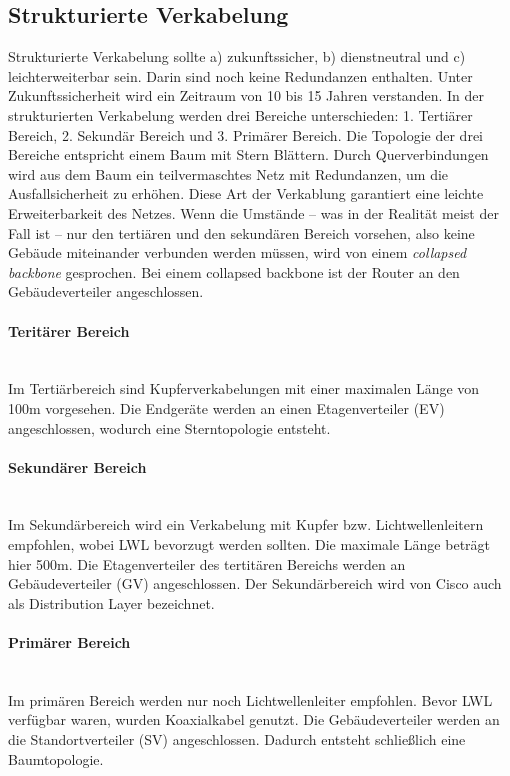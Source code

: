 \subsection{Strukturierte Verkabelung}

Strukturierte Verkabelung sollte a) zukunftssicher, b) dienstneutral und c) leichterweiterbar sein. Darin sind noch keine Redundanzen enthalten. Unter Zukunftssicherheit wird ein Zeitraum von 10 bis 15 Jahren verstanden. In der strukturierten Verkabelung werden drei Bereiche unterschieden: 1. Tertiärer Bereich, 2. Sekundär Bereich und 3. Primärer Bereich. Die Topologie der drei Bereiche entspricht einem Baum mit Stern \ql Blättern\qr. Durch Querverbindungen wird aus dem Baum ein teilvermaschtes Netz mit Redundanzen, um die Ausfallsicherheit zu erhöhen. Diese Art der Verkablung garantiert eine leichte Erweiterbarkeit des Netzes. Wenn die Umstände -- was in der Realität meist der Fall ist -- nur den tertiären und den sekundären Bereich vorsehen, also keine Gebäude miteinander verbunden werden müssen, wird von einem {\it collapsed backbone} gesprochen. Bei einem collapsed backbone ist der Router an den Gebäudeverteiler angeschlossen.

\paragraph{Teritärer Bereich} ~\\

Im Tertiärbereich sind Kupferverkabelungen mit einer maximalen Länge von 100m vorgesehen. Die Endgeräte werden an einen Etagenverteiler (EV) angeschlossen, wodurch eine Sterntopologie entsteht.

\paragraph{Sekundärer Bereich} ~\\

Im Sekundärbereich wird ein Verkabelung mit Kupfer bzw. Lichtwellenleitern empfohlen, wobei LWL bevorzugt werden sollten. Die maximale Länge beträgt hier 500m. Die Etagenverteiler des tertitären Bereichs werden an Gebäudeverteiler (GV) angeschlossen. Der Sekundärbereich wird von Cisco auch als Distribution Layer bezeichnet.

\paragraph{Primärer Bereich} ~\\

Im primären Bereich werden nur noch Lichtwellenleiter empfohlen. Bevor LWL verfügbar waren, wurden Koaxialkabel genutzt. Die Gebäudeverteiler werden an die Standortverteiler (SV) angeschlossen. Dadurch entsteht schließlich eine Baumtopologie.
